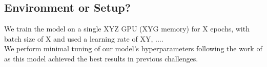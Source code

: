 \subsection{Environment or Setup?}
We train the model on a single XYZ GPU (XYG memory) for X epochs, with batch size of X and used a learning rate of XY, ....\\We perform minimal tuning of our model's hyperparameters following the work
of  as this model achieved the best results in previous challenges.
